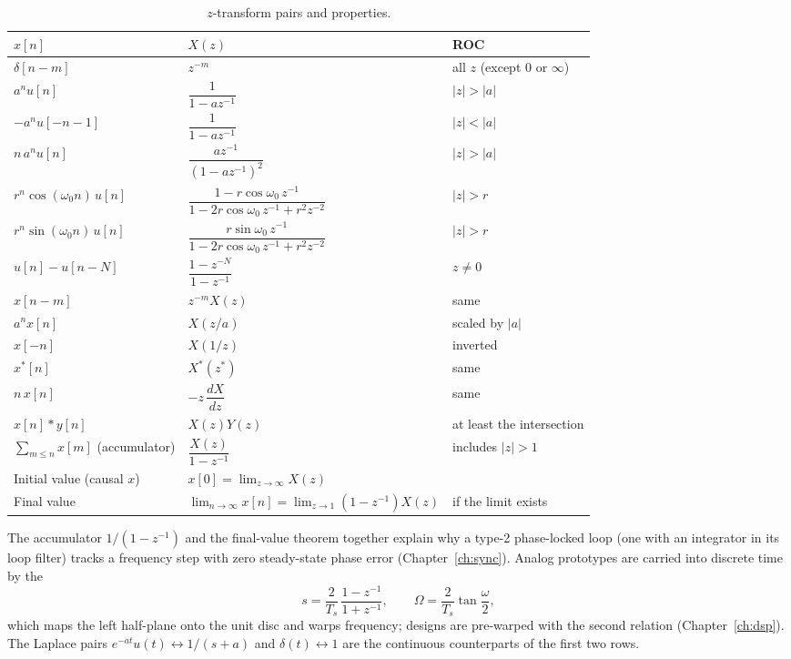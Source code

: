 
\begin{table}[htbp]\centering\small
\caption{$z$-transform pairs and properties.}\label{tab:appA:z}
\begin{tabular}{@{}lll@{}}
\toprule
$x[n]$ & $X(z)$ & ROC\\
\midrule
$\delta[n-m]$ & $z^{-m}$ & all $z$ (except $0$ or $\infty$)\\
$a^n u[n]$ & $\dfrac{1}{1-az^{-1}}$ & $|z|>|a|$\\
$-a^n u[-n-1]$ & $\dfrac{1}{1-az^{-1}}$ & $|z|<|a|$\\
$n\,a^n u[n]$ & $\dfrac{az^{-1}}{(1-az^{-1})^2}$ & $|z|>|a|$\\
$r^n\cos(\omega_0n)\,u[n]$ & $\dfrac{1-r\cos\omega_0\,z^{-1}}{1-2r\cos\omega_0\,z^{-1}+r^2z^{-2}}$ & $|z|>r$\\
$r^n\sin(\omega_0n)\,u[n]$ & $\dfrac{r\sin\omega_0\,z^{-1}}{1-2r\cos\omega_0\,z^{-1}+r^2z^{-2}}$ & $|z|>r$\\
$u[n]-u[n-N]$ & $\dfrac{1-z^{-N}}{1-z^{-1}}$ & $z\ne0$\\
\midrule
$x[n-m]$ & $z^{-m}X(z)$ & same\\
$a^nx[n]$ & $X(z/a)$ & scaled by $|a|$\\
$x[-n]$ & $X(1/z)$ & inverted\\
$x^*[n]$ & $X^*(z^*)$ & same\\
$n\,x[n]$ & $-z\,\dfrac{dX}{dz}$ & same\\
$x[n]*y[n]$ & $X(z)Y(z)$ & at least the intersection\\
$\sum_{m\le n}x[m]$ (accumulator) & $\dfrac{X(z)}{1-z^{-1}}$ & includes $|z|>1$\\
Initial value (causal $x$) & $x[0]=\lim_{z\to\infty}X(z)$ & \\
Final value & $\lim_{n\to\infty}x[n]=\lim_{z\to1}(1-z^{-1})X(z)$ & if the limit exists\\
\bottomrule
\end{tabular}
\end{table}

The accumulator $1/(1-z^{-1})$ and the final-value theorem together explain why a type-2
phase-locked loop (one with an integrator in its loop filter) tracks a frequency step with zero
steady-state phase error (Chapter~\ref{ch:sync}). Analog prototypes are carried into discrete
time by the 
\begin{equation}
s=\frac{2}{T_s}\,\frac{1-z^{-1}}{1+z^{-1}},\qquad \Omega=\frac{2}{T_s}\tan\frac{\omega}{2},
\label{eq:appA:bilinear}
\end{equation}
which maps the left half-plane onto the unit disc and warps frequency; designs are pre-warped
with the second relation (Chapter~\ref{ch:dsp}). The Laplace pairs $e^{-at}u(t)\leftrightarrow
1/(s+a)$ and $\delta(t)\leftrightarrow1$ are the continuous counterparts of the first two rows.

